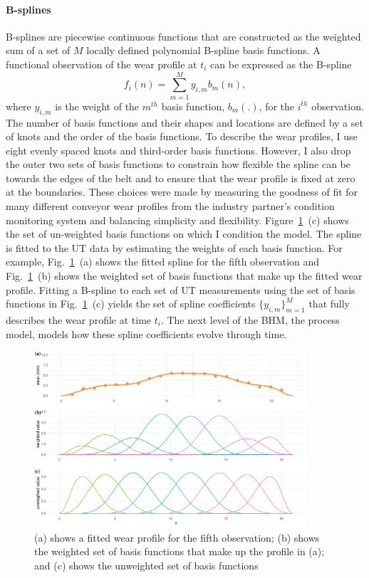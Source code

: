 \paragraph{B-splines}
B-splines are piecewise continuous functions \citep[p. 33-38]{ramsay_2009} that are constructed as the weighted sum of a set of $M$ locally defined polynomial B-spline basis functions. A functional observation of the wear profile at $t_i$ can be expressed as the B-spline
\begin{equation}
 f_i(n) = \sum_{m = 1}^{M} y_{i, m}b_m(n),
 \label{eq:spline}
\end{equation}
where $y_{i, m}$ is the weight of the $m^{th}$ basis function, $b_m(.)$, for the $i^{th}$ observation. The number of basis functions and their shapes and locations are defined by a set of knots and the order of the basis functions. To describe the wear profiles, I use eight evenly spaced knots and third-order basis functions. However, I also drop the outer two sets of basis functions to constrain how flexible the spline can be towards the edges of the belt and to ensure that the wear profile is fixed at zero at the boundaries. These choices were made by measuring the goodness of fit for many different conveyor wear profiles from the industry partner's condition monitoring system and balancing simplicity and flexibility. Figure~\ref{fig:basis-functions}~(c) shows the set of un-weighted basis functions on which I condition the model. The spline is fitted to the UT data by estimating the weights of each basis function. For example, Fig.~\ref{fig:basis-functions}~(a) shows the fitted spline for the fifth observation and Fig.~\ref{fig:basis-functions}~(b) shows the weighted set of basis functions that make up the fitted wear profile. Fitting a B-spline to each set of UT measurements using the set of basis functions in Fig.~\ref{fig:basis-functions}~(c) yields the set of spline coefficients $\{y_{i, m}\}^M_{m = 1}$ that fully describes the wear profile at time $t_i$. The next level of the BHM, the process model, models how these spline coefficients evolve through time.

\begin{figure}[h]
  \centering
  \includegraphics[width=0.9\textwidth]{figures/ch-6/b-spline-fitting.pdf}
  \caption{(a) shows a fitted wear profile for the fifth observation; (b) shows the weighted set of basis functions that make up the profile in (a); and (c) shows the unweighted set of basis functions}
  \label{fig:basis-functions}
\end{figure}


